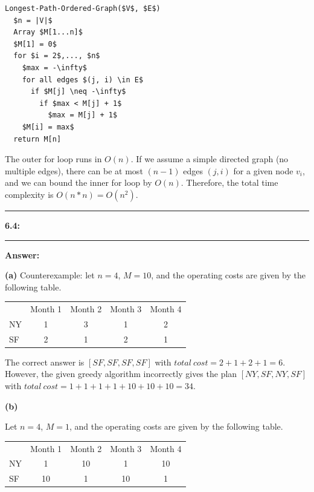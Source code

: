 \documentclass[11pt]{article}
\newcommand\question[2]{\vspace{.25in}\hrule\textbf{#1: #2}\vspace{.5em}\hrule\vspace{.10in}}
\renewcommand\part[1]{\vspace{.10in}\textbf{(#1)}}
\newcommand\answer{\vspace{.10in}\textbf{Answer: }}
\begin{document}
\clearpage

\begin{lstlisting}
Longest-Path-Ordered-Graph($V$, $E$)
  $n = |V|$
  Array $M[1...n]$
  $M[1] = 0$
  for $i = 2$,..., $n$
    $max = -\infty$
    for all edges $(j, i) \in E$
      if $M[j] \neq -\infty$
        if $max < M[j] + 1$
          $max = M[j] + 1$
    $M[i] = max$
  return M[n]
\end{lstlisting}

The outer for loop runs in $O(n)$. If we assume a simple directed graph (no multiple edges), there can be at most $(n - 1)$ edges $(j, i)$ for a given node $v_i$, and we can bound the inner for loop by $O(n)$. Therefore, the total time complexity is $O(n * n) = O(n^2)$.

\clearpage

\question{6.4}{}

\answer

\part{a}
Counterexample: let $n = 4$, $M = 10$, and the operating costs are given by the following table.

\begin{table}[h!]
\begin{tabular}{lcccc}
   & \multicolumn{1}{l}{Month 1} & \multicolumn{1}{l}{Month 2} & \multicolumn{1}{l}{Month 3} & \multicolumn{1}{l}{Month 4} \\
NY & 1                           & 3                           & 1                           & 2                           \\
SF & 2                           & 1                           & 2                           & 1                          
\end{tabular}
\end{table}

The correct answer is $[SF, SF, SF, SF]$ with $total\:cost = 2 + 1 + 2 + 1 = 6$. However, the given greedy algorithm incorrectly gives the plan $[NY, SF, NY, SF]$ with $total\:cost = 1 + 1 + 1 + 1 + 10 + 10 + 10 = 34$.

\part{b}

Let $n = 4$, $M = 1$, and the operating costs are given by the following table.

\begin{table}[h!]
\begin{tabular}{lcccc}
   & \multicolumn{1}{l}{Month 1} & \multicolumn{1}{l}{Month 2} & \multicolumn{1}{l}{Month 3} & \multicolumn{1}{l}{Month 4} \\
NY & 1                           & 10                           & 1                           & 10                           \\
SF & 10                           & 1                           & 10                           & 1                          
\end{tabular}
\end{table}
\end{document}

